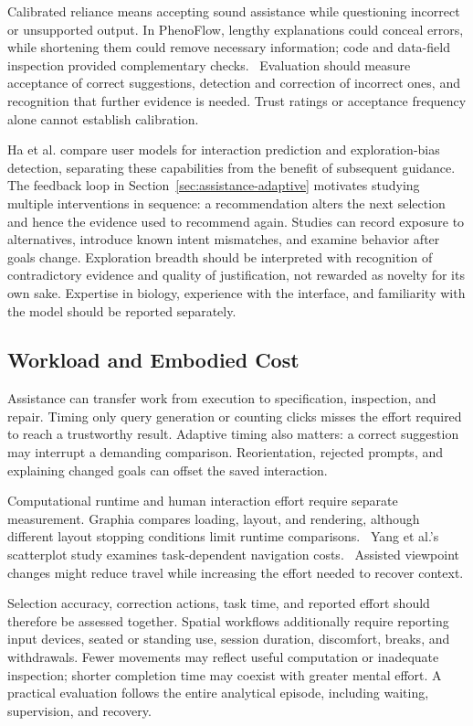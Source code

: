 Calibrated reliance means accepting sound assistance while questioning incorrect or unsupported output. In PhenoFlow, lengthy explanations could conceal errors, while shortening them could remove necessary information; code and data-field inspection provided complementary checks.~\cite{EvalKim2025} Evaluation should measure acceptance of correct suggestions, detection and correction of incorrect ones, and recognition that further evidence is needed. Trust ratings or acceptance frequency alone cannot establish calibration.

Ha et al. compare user models for interaction prediction and exploration-bias detection, separating these capabilities from the benefit of subsequent guidance.~\cite{EvalHa2023} The feedback loop in Section~\ref{sec:assistance-adaptive} motivates studying multiple interventions in sequence: a recommendation alters the next selection and hence the evidence used to recommend again. Studies can record exposure to alternatives, introduce known intent mismatches, and examine behavior after goals change. Exploration breadth should be interpreted with recognition of contradictory evidence and quality of justification, not rewarded as novelty for its own sake. Expertise in biology, experience with the interface, and familiarity with the model should be reported separately.

\subsection{Workload and Embodied Cost}
\label{sec:evaluation-workload}
Assistance can transfer work from execution to specification, inspection, and repair. Timing only query generation or counting clicks misses the effort required to reach a trustworthy result. Adaptive timing also matters: a correct suggestion may interrupt a demanding comparison. Reorientation, rejected prompts, and explaining changed goals can offset the saved interaction.

Computational runtime and human interaction effort require separate measurement. Graphia compares loading, layout, and rendering, although different layout stopping conditions limit runtime comparisons.~\cite{EvalFreeman2022} Yang et al.'s scatterplot study examines task-dependent navigation costs.~\cite{EvalYang2021} Assisted viewpoint changes might reduce travel while increasing the effort needed to recover context.

Selection accuracy, correction actions, task time, and reported effort should therefore be assessed together. Spatial workflows additionally require reporting input devices, seated or standing use, session duration, discomfort, breaks, and withdrawals. Fewer movements may reflect useful computation or inadequate inspection; shorter completion time may coexist with greater mental effort. A practical evaluation follows the entire analytical episode, including waiting, supervision, and recovery.

